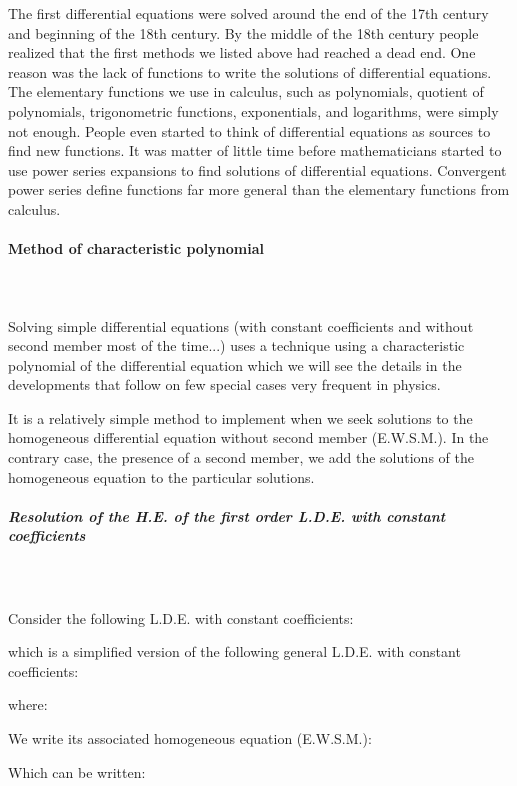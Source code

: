 	\begin{tcolorbox}[title=Remark,colframe=black,arc=10pt]
	The first differential equations were solved around the end of the 17th century and beginning of the 18th century. By the middle of the 18th century people realized that the first methods we listed above had reached a dead end. One reason was the lack of functions to write the solutions of differential equations. The elementary functions we use in calculus, such as polynomials, quotient of polynomials, trigonometric functions, exponentials, and logarithms, were simply not enough. People even started to think of differential equations as sources to find new functions. It was matter of little time before mathematicians started to use power series expansions to find solutions of differential equations. Convergent power series define functions far more general than the elementary functions from calculus.
	\end{tcolorbox}
	
	\paragraph{Method of characteristic polynomial}\mbox{}\\\\
	Solving simple differential equations (with constant coefficients and without second member most of the time...) uses a technique using a characteristic polynomial of the differential equation which we will see the details in the developments that follow on  few special cases very frequent in physics.
	
	It is a relatively simple method to implement when we seek solutions to the homogeneous differential equation without second member (E.W.S.M.). In the contrary case, the presence of a second member, we add the solutions of the homogeneous equation to the particular solutions.
	
	\subparagraph{Resolution of the H.E. of the first order L.D.E. with constant coefficients}\mbox{}\\\\

	Consider the following L.D.E. with constant coefficients:
	
	which is a simplified version of the following general L.D.E.  with constant coefficients:
	
	where:
	
	We write its associated homogeneous equation (E.W.S.M.):
	
	Which can be written:
	
